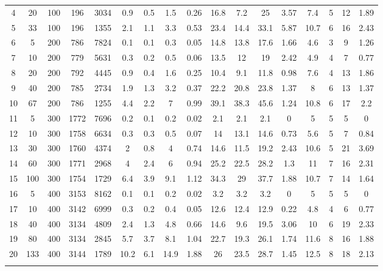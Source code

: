 \documentclass[11pt]{article}
\newcommand{\np}{\newpage}
\begin{document}
\begin{landscape}
\begin{longtable}[c]{ccccc|cccc|cccc|cccc}
		4 & 20 & 100 & 196 & 3034 & 0.9 & 0.5 & 1.5 & 0.26 & 16.8 & 7.2 & 25 & 3.57 & 7.4 & 5 & 12 & 1.89 \\
		\rowcolor[HTML]{EFEFEF} 
		5 & 33 & 100 & 196 & 1355 & 2.1 & 1.1 & 3.3 & 0.53 & 23.4 & 14.4 & 33.1 & 5.87 & 10.7 & 6 & 16 & 2.43 \\
		6 & 5 & 200 & 786 & 7824 & 0.1 & 0.1 & 0.3 & 0.05 & 14.8 & 13.8 & 17.6 & 1.66 & 4.6 & 3 & 9 & 1.26 \\
		7 & 10 & 200 & 779 & 5631 & 0.3 & 0.2 & 0.5 & 0.06 & 13.5 & 12 & 19 & 2.42 & 4.9 & 4 & 7 & 0.77 \\
		8 & 20 & 200 & 792 & 4445 & 0.9 & 0.4 & 1.6 & 0.25 & 10.4 & 9.1 & 11.8 & 0.98 & 7.6 & 4 & 13 & 1.86 \\
		9 & 40 & 200 & 785 & 2734 & 1.9 & 1.3 & 3.2 & 0.37 & 22.2 & 20.8 & 23.8 & 1.37 & 8 & 6 & 13 & 1.37 \\
		10 & 67 & 200 & 786 & 1255 & 4.4 & 2.2 & 7 & 0.99 & 39.1 & 38.3 & 45.6 & 1.24 & 10.8 & 6 & 17 & 2.2 \\
		\rowcolor[HTML]{EFEFEF} 
		11 & 5 & 300 & 1772 & 7696 & 0.2 & 0.1 & 0.2 & 0.02 & 2.1 & 2.1 & 2.1 & 0 & 5 & 5 & 5 & 0 \\
		\rowcolor[HTML]{EFEFEF} 
		12 & 10 & 300 & 1758 & 6634 & 0.3 & 0.3 & 0.5 & 0.07 & 14 & 13.1 & 14.6 & 0.73 & 5.6 & 5 & 7 & 0.84 \\
		\rowcolor[HTML]{EFEFEF} 
		13 & 30 & 300 & 1760 & 4374 & 2 & 0.8 & 4 & 0.74 & 14.6 & 11.5 & 19.2 & 2.43 & 10.6 & 5 & 21 & 3.69 \\
		\rowcolor[HTML]{EFEFEF} 
		14 & 60 & 300 & 1771 & 2968 & 4 & 2.4 & 6 & 0.94 & 25.2 & 22.5 & 28.2 & 1.3 & 11 & 7 & 16 & 2.31 \\
		\rowcolor[HTML]{EFEFEF} 
		15 & 100 & 300 & 1754 & 1729 & 6.4 & 3.9 & 9.1 & 1.12 & 34.3 & 29 & 37.7 & 1.88 & 10.7 & 7 & 14 & 1.64 \\
		16 & 5 & 400 & 3153 & 8162 & 0.1 & 0.1 & 0.2 & 0.02 & 3.2 & 3.2 & 3.2 & 0 & 5 & 5 & 5 & 0 \\
		17 & 10 & 400 & 3142 & 6999 & 0.3 & 0.2 & 0.4 & 0.05 & 12.6 & 12.4 & 12.9 & 0.22 & 4.8 & 4 & 6 & 0.77 \\
		18 & 40 & 400 & 3134 & 4809 & 2.4 & 1.3 & 4.8 & 0.66 & 14.6 & 9.6 & 19.5 & 3.06 & 10 & 6 & 19 & 2.33 \\
		19 & 80 & 400 & 3134 & 2845 & 5.7 & 3.7 & 8.1 & 1.04 & 22.7 & 19.3 & 26.1 & 1.74 & 11.6 & 8 & 16 & 1.88 \\
		20 & 133 & 400 & 3144 & 1789 & 10.2 & 6.1 & 14.9 & 1.88 & 26 & 23.5 & 28.7 & 1.45 & 12.5 & 8 & 18 & 2.13 \\ \np

\end{longtable}
\end{landscape}
\end{document}
